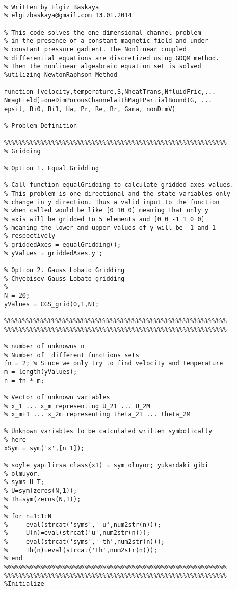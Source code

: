 \begin{lstlisting}

% Written by Elgiz Baskaya
% elgizbaskaya@gmail.com 13.01.2014

% This code solves the one dimensional channel problem
% in the presence of a constant magnetic field and under 
% constant pressure gadient. The Nonlinear coupled 
% differential equations are discretized using GDQM method. 
% Then the nonlinear algeabraic equation set is solved 
%utilizing NewtonRaphson Method

function [velocity,temperature,S,NheatTrans,NfluidFric,...
NmagField]=oneDimPorousChannelwithMagFPartialBound(G, ...
epsil, Bi0, Bi1, Ha, Pr, Re, Br, Gama, nonDimV)

% Problem Definition

%%%%%%%%%%%%%%%%%%%%%%%%%%%%%%%%%%%%%%%%%%%%%%%%%%%%%%%%%%%%%
% Gridding 

% Option 1. Equal Gridding

% Call function equalGridding to calculate gridded axes values.
% This problem is one directional and the state variables only 
% change in y direction. Thus a valid input to the function 
% when called would be like [0 10 0] meaning that only y 
% axis will be gridded to 5 elements and [0 0 -1 1 0 0] 
% meaning the lower and upper values of y will be -1 and 1 
% respectively
% griddedAxes = equalGridding();
% yValues = griddedAxes.y';

% Option 2. Gauss Lobato Gridding
% Chyebisev Gauss Lobato gridding
% 
N = 20;
yValues = CGS_grid(0,1,N);

%%%%%%%%%%%%%%%%%%%%%%%%%%%%%%%%%%%%%%%%%%%%%%%%%%%%%%%%%%%%%
%%%%%%%%%%%%%%%%%%%%%%%%%%%%%%%%%%%%%%%%%%%%%%%%%%%%%%%%%%%%%

% number of unknowns n
% Number of  different functions sets 
fn = 2; % Since we only try to find velocity and temperature
m = length(yValues);
n = fn * m;

% Vector of unknown variables 
% x_1 ... x_m representing U_21 ... U_2M
% x_m+1 ... x_2m representing theta_21 ... theta_2M

% Unknown variables to be calculated written symbolically
% here
xSym = sym('x',[n 1]);

% soyle yapilirsa class(x1) = sym oluyor; yukardaki gibi 
% olmuyor.
% syms U T;
% U=sym(zeros(N,1));
% Th=sym(zeros(N,1));
% 
% for n=1:1:N
%     eval(strcat('syms',' u',num2str(n)));
%     U(n)=eval(strcat('u',num2str(n)));
%     eval(strcat('syms',' th',num2str(n)));
%     Th(n)=eval(strcat('th',num2str(n)));
% end
%%%%%%%%%%%%%%%%%%%%%%%%%%%%%%%%%%%%%%%%%%%%%%%%%%%%%%%%%%%%%
%%%%%%%%%%%%%%%%%%%%%%%%%%%%%%%%%%%%%%%%%%%%%%%%%%%%%%%%%%%%%
%Initialize


\end{lstlisting}

